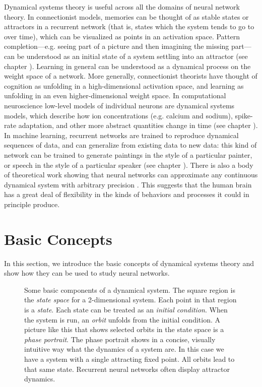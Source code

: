 Dynamical systems theory is useful across all the domains of neural network theory. In connectionist models,  memories can be thought of as stable states or attractors in a recurrent network (that is, states which the system tends to go to over time), which can be visualized as points in an activation space. Pattern completion---e.g. seeing part of a picture and then imagining the missing part---can be understood as an initial state of a system settling into an attractor (see chapter ). Learning in general can be understood as a dynamical process on the weight space of a network. More generally, connectionist theorists have thought of cognition as unfolding in a high-dimensional activation space, and learning as unfolding in an even higher-dimensional weight space. In computational neuroscience low-level models of individual neurons are dynamical systems models, which describe how ion concentrations (e.g. calcium and sodium), spike-rate adaptation, and other more abstract quantities change in time (see chapter ). In machine learning, recurrent networks are trained to reproduce dynamical sequences of data, and can generalize from existing data to new data: this kind of network can be trained to generate paintings in the style of a particular painter, or speech in the style of a particular speaker (see chapter ). There is also a body of theoretical work showing that neural networks can approximate any continuous dynamical system with arbitrary precision \cite{funahashi1993approximation}. This suggests that the human brain has a great deal of flexibility in the kinds of behaviors and processes it could in principle produce.

\section{Basic Concepts}

In this section, we introduce the basic concepts of dynamical systems theory and show
how they can be used to study neural networks.

\begin{figure}[h]
\centering
{}
\caption[Pamela Payne.]{Some basic components of a dynamical system. The square region is the \emph{state space} for a 2-dimensional system. Each point in that region is a \emph{state}. Each state can be treated as an \emph{initial condition}. When the system is run, an \emph{orbit} unfolds from the initial condition. A picture like this that shows selected orbits in the state space is a \emph{phase portrait}. The phase portrait shows in a concise, visually intuitive way what the dynamics of a system are. In this case we have a system with a single attracting fixed point. All orbits lead to that same state. Recurrent neural networks often display attractor dynamics.}
\label{F:stateSpaceParts}
\end{figure}

